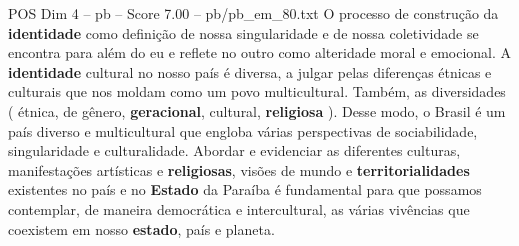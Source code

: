 \begin{textsample}{POS Dim 4 – pb – Score 7.00 – pb/pb\_em\_80.txt}
O processo de construção da \textbf{identidade} como definição de nossa singularidade e de nossa coletividade se encontra para além do eu e reflete no outro como alteridade moral e emocional.
A \textbf{identidade} cultural no nosso país é diversa, a julgar pelas diferenças étnicas e culturais que nos moldam como um povo multicultural.
Também, as diversidades ( étnica, de gênero, \textbf{geracional}, cultural, \textbf{religiosa} ).
Desse modo, o Brasil é um país diverso e multicultural que engloba várias perspectivas de sociabilidade, singularidade e culturalidade.
Abordar e evidenciar as diferentes culturas, manifestações artísticas e \textbf{religiosas}, visões de mundo e \textbf{territorialidades} existentes no país e no \textbf{Estado} da Paraíba é fundamental para que possamos contemplar, de maneira democrática e intercultural, as várias vivências que coexistem em nosso \textbf{estado}, país e planeta.

\end{textsample}

